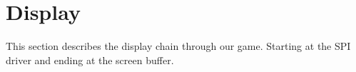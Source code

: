 \section{Display}

This section describes the display chain through our game. Starting at the SPI driver and ending at the screen buffer.




